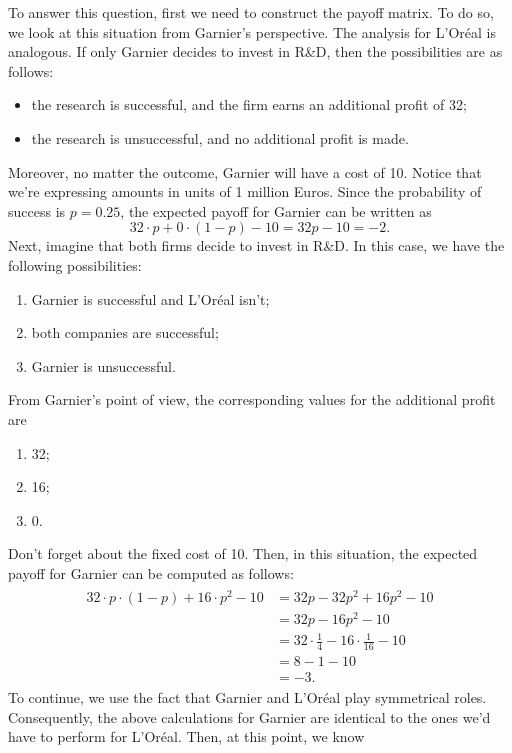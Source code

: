 \documentclass[11pt]{article}
\begin{document}
To answer this question, first we need to construct the payoff matrix. To do so,
we look at this situation from Garnier's perspective. The analysis for L'Oréal
is analogous. If only Garnier decides to invest in R\&D, then the possibilities
are as follows:
\begin{itemize}
\item the research is successful, and the firm earns an additional profit of 32;
\item the research is unsuccessful, and no additional profit is made.
\end{itemize}
Moreover, no matter the outcome, Garnier will have a cost of 10. Notice that
we're expressing amounts in units of 1 million Euros. Since the probability of
success is \(p=0.25\), the expected payoff for Garnier can be written as
\begin{equation*}
32\cdot p+0\cdot(1-p)-10=32p-10=-2.
\end{equation*}
Next, imagine that both firms decide to invest in R\&D. In this case, we have the
following possibilities:
\begin{enumerate}
\item Garnier is successful and L'Oréal isn't;
\item both companies are successful;
\item Garnier is unsuccessful.
\end{enumerate}
From Garnier's point of view, the corresponding values for the additional
profit are
\begin{enumerate}
\item 32;
\item 16;
\item 0.
\end{enumerate}
Don't forget about the fixed cost of 10. Then, in this situation, the expected
payoff for Garnier can be computed as follows:
\begin{align*}
  \begin{split}
    32\cdot p\cdot(1-p)+16\cdot p^2-10&=32p-32p^2+16p^2-10\\
    &=32p-16p^2-10\\
    &=32\cdot\frac{1}{4}-16\cdot\frac{1}{16}-10\\
    &=8-1-10\\
    &=-3.
  \end{split}
\end{align*}
To continue, we use the fact that Garnier and L'Oréal play symmetrical
roles. Consequently, the above calculations for Garnier are identical to
the ones we'd have to perform for L'Oréal. Then, at this point, we know
\end{document}
